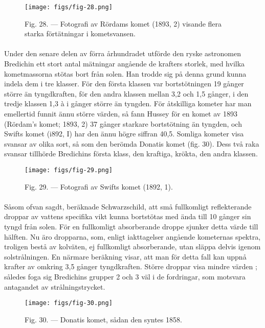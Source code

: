 \documentclass[a4paper, 12pt, oneside, swedish]{article}
\begin{document}
\begin{figure}[H]
\centering
\texttt{[image: figs/fig-28.png]}
\caption{Fig. 28. --- Fotografi av Rördams komet (1893, 2) visande flera starka förtätningar i kometsvansen.}
\end{figure}
\paragraph{}
Under den senare delen av förra århundradet utförde den ryske astronomen Bredichin ett stort antal mätningar angående de krafters storlek, med hvilka kometmassorna stötas bort från solen. Han trodde sig på denna grund kunna indela dem i tre klasser. För den första klassen var bortstötningen 19 gånger större än tyngdkraften, för den andra klassen mellan 3,2 och 1,5 gånger, i den tredje klassen 1,3 à i gånger större än tyngden. För åtskilliga kometer har man emellertid funnit ännu större värden, så fann Hussey för en komet av 1893 (Rördam's komet; 1893, 2) 37 gånger starkare bortstötning än tyngden, och Swifts komet (i892, I) har den ännu högre siffran 40,5. Somliga kometer visa svansar av olika sort, så som den berömda Donatis komet (fig. 30). Dess två raka svansar tillhörde Bredichins första klass, den kraftiga, krökta, den andra klassen.

\begin{figure}[H]
\centering
\texttt{[image: figs/fig-29.png]}
\caption{Fig. 29. --- Fotografi av Swifts komet (1892, 1).}
\end{figure}
\paragraph{}
Såsom ofvan sagdt, beräknade Schwarzschild, att små fullkomligt reflekterande droppar av vattens specifika vikt kunna bortstötas med ända till 10 gånger sin tyngd från solen. För en fullkomligt absorberande droppe sjunker detta värde till hälften. Nu äro dropparna, som, enligt iakttagelser angående kometernas spektra, troligen bestå av kolväten, ej fullkomligt absorberande, utan släppa delvis igenom solstrålningen. En närmare beräkning visar, att man för detta fall kan uppnå krafter av omkring 3,5 gånger tyngdkraften. Större droppar visa mindre värden ; således foga sig Bredichins grupper 2 och 3 väl i de fordringar, som motsvara antagandet av strålningstrycket.

\begin{figure}[H]
\centering
\texttt{[image: figs/fig-30.png]}
\caption{Fig. 30. --- Donatis komet, sådan den syntes 1858.}
\end{figure}
\end{document}
